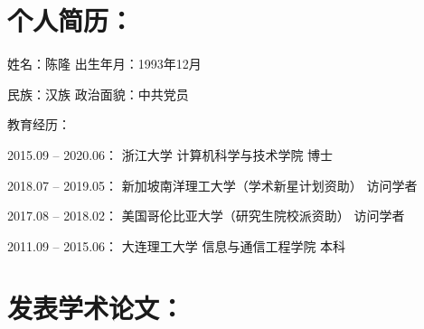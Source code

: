 \begin{publications}

\section*{个人简历：}
姓名：陈隆 \qquad\qquad\qquad\qquad\qquad\qquad 出生年月：1993年12月

民族：汉族 \qquad\qquad\qquad\qquad\qquad\qquad 政治面貌：中共党员

 
\vspace{1.0em}
教育经历：
\begin{asparaitem}                                                
\item{2015.09 – 2020.06： \quad 浙江大学 \qquad\qquad 计算机科学与技术学院 \qquad  博士}
\item{2018.07 – 2019.05： \quad 新加坡南洋理工大学（学术新星计划资助） \quad 访问学者}
\item{2017.08 – 2018.02： \quad 美国哥伦比亚大学（研究生院校派资助） \qquad 访问学者}
\item{2011.09 – 2015.06： \quad 大连理工大学 \qquad 信息与通信工程学院 \qquad\quad 本科}  
\end{asparaitem}

\section*{发表学术论文：}







\end{publications}
